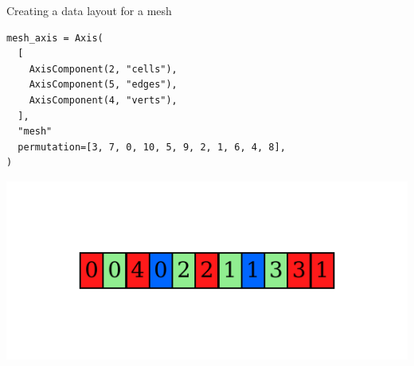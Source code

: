 \documentclass[aspectratio=169]{beamer}
\begin{document}
\begin{frame}[fragile]{Creating a data layout for a mesh}
  \noindent
  \begin{minipage}{.4\textwidth}
    \begin{tikzpicture}[scale=.9]
      
    \end{tikzpicture}
  \end{minipage}%
  \begin{minipage}{.55\textwidth}
    \begin{tcolorbox}
      \begin{verbatim}
mesh_axis = Axis(
  [
    AxisComponent(2, "cells"),
    AxisComponent(5, "edges"),
    AxisComponent(4, "verts"),
  ],
  "mesh"
  permutation=[3, 7, 0, 10, 5, 9, 2, 1, 6, 4, 8],
)
      \end{verbatim}
    \end{tcolorbox}
  \end{minipage}

  \pause
  \vspace{-2em}

  \begin{center}
    \includegraphics{scripts/two_cell_mesh.gv.pdf}
  \end{center}
\end{frame}
\end{document}
